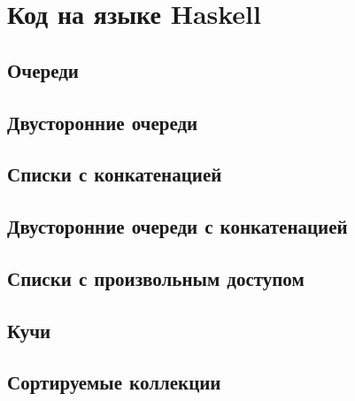 \appendix
\chapter{Код на языке Haskell}
\label{app:A}
\lstset{language=Haskell}
\section{Очереди}

\codesep

\codesep

\codesep

\codesep

\codesep

\codesep


\section{Двусторонние очереди}

\codesep


\section{Списки с конкатенацией}

\codesep


\section{Двусторонние очереди с конкатенацией}

\codesep

\codesep


\section{Списки с произвольным доступом}

\codesep

\codesep

\codesep


\section{Кучи}

\codesep

\codesep

\codesep

\codesep

\codesep

\codesep

\codesep


\section{Сортируемые коллекции}

\codesep


